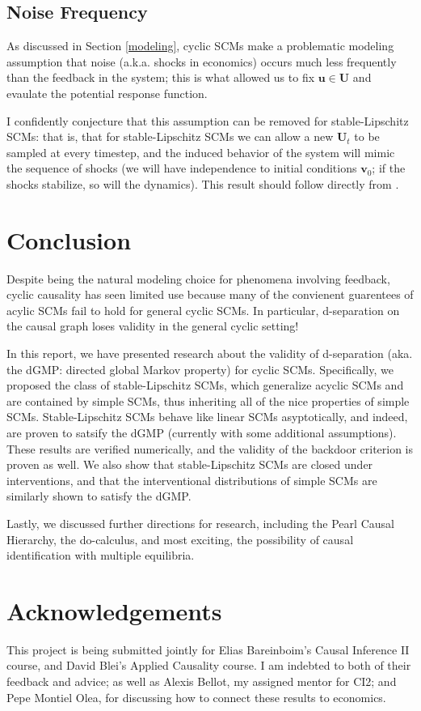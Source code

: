 \documentclass[12pt]{article}
\begin{document}
\subsection{Noise Frequency}\label{noise}
As discussed in Section \ref{modeling}, cyclic SCMs make a problematic modeling assumption that noise (a.k.a. shocks in economics) occurs much less frequently than the feedback in the system; this is what allowed us to fix $\mathbf{u}\in\mathbf{U}$ and evaulate the potential response function.

I confidently conjecture that this assumption can be removed for stable-Lipschitz SCMs: that is, that for stable-Lipschitz SCMs we can allow a new $\mathbf{U}_t$ to be sampled at every timestep, and the induced behavior of the system will mimic the sequence of shocks (we will have independence to initial conditions $\mathbf{v}_0$; if the shocks stabilize, so will the dynamics). This result should follow directly from \cite{ReberIntrinsic, Switched}.

\section{Conclusion}
Despite being the natural modeling choice for phenomena involving feedback, cyclic causality has seen limited use because many of the convienent guarentees of acylic SCMs fail to hold for general cyclic SCMs. In particular, d-separation on the causal graph loses validity in the general cyclic setting!

In this report, we have presented research about the validity of d-separation (aka. the dGMP: directed global Markov property) for cyclic SCMs. Specifically, we proposed the class of stable-Lipschitz SCMs, which generalize acyclic SCMs and are contained by simple SCMs, thus inheriting all of the nice properties of simple SCMs. Stable-Lipschitz SCMs behave like linear SCMs asyptotically, and indeed, are proven to satsify the dGMP (currently with some additional assumptions).
These results are verified numerically, and the validity of the backdoor criterion is proven as well. We also show that stable-Lipschitz SCMs are closed under interventions, and that the interventional distributions of simple SCMs are similarly shown to satisfy the dGMP.

Lastly, we discussed further directions for research, including the Pearl Causal Hierarchy, the do-calculus, and most exciting, the possibility of causal identification with multiple equilibria.

\section{Acknowledgements}
This project is being submitted jointly for Elias Bareinboim's Causal Inference II course, and David Blei's Applied Causality course. I am indebted to both of their feedback and advice; as well as Alexis Bellot, my assigned mentor for CI2; and Pepe Montiel Olea, for discussing how to connect these results to economics.
\end{document}
